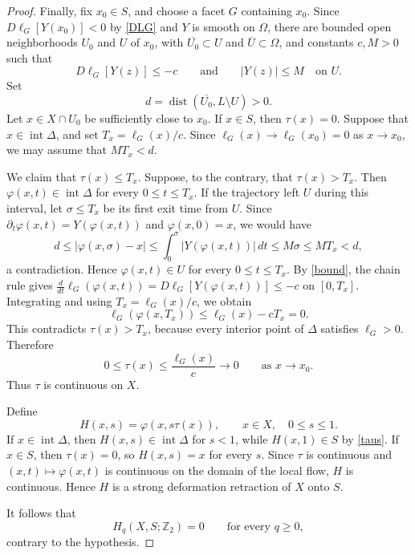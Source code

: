 \documentclass[12pt,reqno]{amsart}
\numberwithin{equation}{section}
\theoremstyle{remark}
\begin{document}
\begin{proof}
	Finally, fix \(x_0\in S\), and choose a facet \(G\) containing
	\(x_0\). Since \(D\ell_G[Y(x_0)]<0\) by \eqref{DLG} and \(Y\) is smooth on
	\(\Omega\), there are bounded open
	neighborhoods \(U_0\) and \(U\) of \(x_0\), with
	\(\overline{U_0}\subset U\) and
	\(\overline U\subset\Omega\), and constants \(c,M>0\) such that
	\begin{equation}\label{bound}
	D\ell_G[Y(z)]\leq-c
	\qquad\text{and}\qquad
	|Y(z)|\leq M
	\quad\text{on }U.
	\end{equation}
	Set
	\[
	d=\operatorname{dist}(\overline{U_0},L\setminus U)>0.
	\]
	Let \(x\in X\cap U_0\) be sufficiently close to \(x_0\). If
	\(x\in S\), then \(\tau(x)=0\). Suppose that
	\(x\in\operatorname{int}\Delta\), and set
	\(T_x=\ell_G(x)/c\). Since \(\ell_G(x)\to\ell_G(x_0)=0\) as
	\(x\to x_0\), we may assume that \(MT_x<d\).
	
We claim that \(\tau(x)\leq T_x\). Suppose, to the contrary,
that \(\tau(x)>T_x\). Then
\(\varphi(x,t)\in\operatorname{int}\Delta\) for every
\(0\leq t\leq T_x\).
If the trajectory left \(U\) during this interval, let
\(\sigma\leq T_x\) be its first exit time from \(U\).
Since \(\partial_t\varphi(x,t)=Y(\varphi(x,t))\) and
\(\varphi(x,0)=x\), we would have
\[
d
\leq
|\varphi(x,\sigma)-x|
\leq
\int_0^\sigma |Y(\varphi(x,t))|\,dt
\leq
M\sigma
\leq
MT_x
<d,
\]
a contradiction.  Hence \(\varphi(x,t)\in U\) for every \(0\leq t\leq T_x\).
By \eqref{bound}, the chain rule gives
\(\frac{d}{dt}\ell_G(\varphi(x,t))
=D\ell_G[Y(\varphi(x,t))]\leq-c\) on \([0,T_x]\).
Integrating and using \(T_x=\ell_G(x)/c\), we obtain
\[
\ell_G(\varphi(x,T_x))
\leq
\ell_G(x)-cT_x
=0.
\]
	This contradicts \(\tau(x)>T_x\), because every interior point of
	\(\Delta\) satisfies \(\ell_G>0\). Therefore
	\[
	0\leq\tau(x)\leq\frac{\ell_G(x)}{c}\longrightarrow0
	\qquad
	\text{as }x\to x_0.
	\]
	Thus \(\tau\) is continuous on \(X\).
	
	Define
	\[
	H(x,s)=\varphi(x,s\tau(x)),
	\qquad
	x\in X,\quad 0\leq s\leq1.
	\]
	If \(x\in\operatorname{int}\Delta\), then
	\(H(x,s)\in\operatorname{int}\Delta\) for \(s<1\), while
	\(H(x,1)\in S\) by \eqref{taus}. If \(x\in S\), then \(\tau(x)=0\), so
	\(H(x,s)=x\) for every \(s\). Since \(\tau\) is continuous and
	\((x,t)\mapsto\varphi(x,t)\) is continuous on the domain of the
	local flow, \(H\) is continuous. Hence \(H\) is a strong
	deformation retraction of \(X\) onto \(S\).
	
	It follows that
	\[
	H_q(X,S;\mathbb Z_2)=0
	\qquad
	\text{for every }q\geq0,
	\]
	contrary to the hypothesis.
\end{proof}
\end{document}
